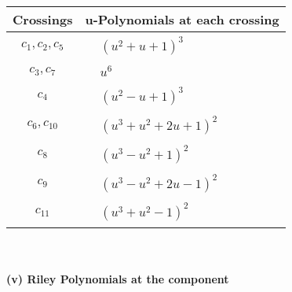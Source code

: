 \documentclass[1p]{elsarticle_modified}
\theoremstyle{definition}
\begin{document}
\begin{tabular}{m{50pt}|m{274pt}}
Crossings & \hspace{64pt}u-Polynomials at each crossing \\
\hline $$\begin{aligned}c_{1},c_{2},c_{5}\end{aligned}$$&$\begin{aligned}
&(u^2+u+1)^3
\end{aligned}$\\
\hline $$\begin{aligned}c_{3},c_{7}\end{aligned}$$&$\begin{aligned}
&u^6
\end{aligned}$\\
\hline $$\begin{aligned}c_{4}\end{aligned}$$&$\begin{aligned}
&(u^2- u+1)^3
\end{aligned}$\\
\hline $$\begin{aligned}c_{6},c_{10}\end{aligned}$$&$\begin{aligned}
&(u^3+u^2+2 u+1)^2
\end{aligned}$\\
\hline $$\begin{aligned}c_{8}\end{aligned}$$&$\begin{aligned}
&(u^3- u^2+1)^2
\end{aligned}$\\
\hline $$\begin{aligned}c_{9}\end{aligned}$$&$\begin{aligned}
&(u^3- u^2+2 u-1)^2
\end{aligned}$\\
\hline $$\begin{aligned}c_{11}\end{aligned}$$&$\begin{aligned}
&(u^3+u^2-1)^2
\end{aligned}$\\
\hline
\end{tabular}\\~\\
\newpage\renewcommand{\arraystretch}{1}
\flushleft \textbf{(v) Riley Polynomials at the component}\newline \\
\end{document}
